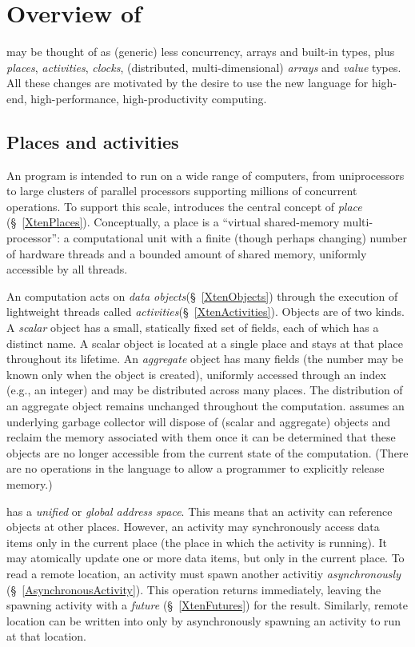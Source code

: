 \chapter{Overview of \Xten}

\Xten{} may be thought of as (generic) \java{} less concurrency,
arrays and built-in types, plus \emph{places},
\emph{activities}, \emph{
clocks}, (distributed, multi-dimensional) \emph{arrays} and
\emph{value}
types. All these changes are motivated by the desire to use the new
language for high-end, high-performance, high-productivity computing.

\section{Places and activities}
An \Xten{} program is intended to run on a wide range of computers,
from uniprocessors to large clusters of parallel processors supporting
millions of concurrent operations. To support this scale, \Xten{}
introduces the central concept of \emph{place} (\S~\ref{XtenPlaces}).
Conceptually, a place is a ``virtual shared-memory multi-processor'':
a computational unit with a finite (though perhaps changing) number of
hardware threads and a bounded amount of shared memory, uniformly
accessible by all threads.

An \Xten{} computation acts on \emph{data
objects}(\S~\ref{XtenObjects}) through the execution of lightweight
threads called \emph{activities}(\S~\ref{XtenActivities}).  Objects are
of two kinds. A \emph{scalar} object has a small, statically fixed set
of fields, each of which has a distinct name. A scalar object is
located at a single place and stays at that place throughout its
lifetime.  An \emph{aggregate} object has many fields (the number may
be known only when the object is created), uniformly accessed through
an index (e.g., an integer) and may be distributed across many
places. The distribution of an aggregate object remains unchanged
throughout the computation. \Xten{} assumes an underlying garbage
collector will dispose of (scalar and aggregate) objects and reclaim
the memory associated with them once it can be determined that these
objects are no longer accessible from the current state of the
computation. (There are no operations in the language to allow a
programmer to explicitly release memory.)

{}\Xten{} has a \emph{unified} or \emph{global address space}. This
means that an activity can reference objects at other places.
However, an activity may synchronously access data items only in the
current place (the place in which the activity is running). It may
atomically update one or more data items, but only in the current
place.  To read a remote location, an activity must spawn another
activitiy \emph{asynchronously} (\S~\ref{AsynchronousActivity}). This
operation returns immediately, leaving the spawning activity with a
\emph{future} (\S~\ref{XtenFutures}) for the result. Similarly, remote
location can be written into only by asynchronously spawning an
activity to run at that location.


